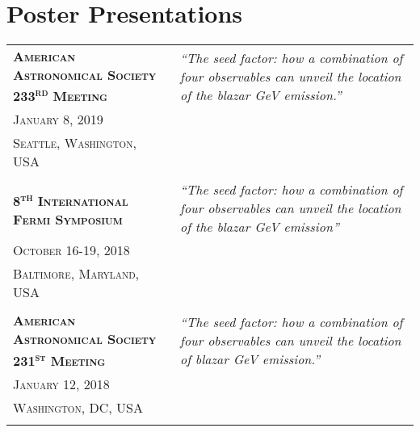 %
%
%

\section{\texorpdfstring{\color{Blue}Poster Presentations}{Poster Presentations}}

\begin{longtable}{p{5cm}|p{12.3cm}}
    \textsc{\textbf{American Astronomical Society 233\textsuperscript{rd} Meeting}}& \emph{``The seed factor: how a combination of four observables can unveil the location of the blazar GeV emission.''}\\
    \textsc{January 8, 2019}\\
    \textsc{Seattle, Washington, USA}\\
    \multicolumn{2}{c}{} \\


    \textsc{\textbf{8\textsuperscript{th} International Fermi Symposium}}& \emph{``The seed factor: how a combination of four observables can unveil the location of the blazar GeV emission''}\\
    \textsc{October 16-19, 2018}\\
    \textsc{Baltimore, Maryland, USA}\\
    \multicolumn{2}{c}{} \\


    \textsc{\textbf{American Astronomical Society 231\textsuperscript{st} Meeting}}& \emph{``The seed factor: how a combination of four observables can unveil the location of blazar GeV emission.''}\\
    \textsc{January 12, 2018}\\
    \textsc{Washington, DC, USA}\\
    \multicolumn{2}{c}{} \\


\end{longtable}
